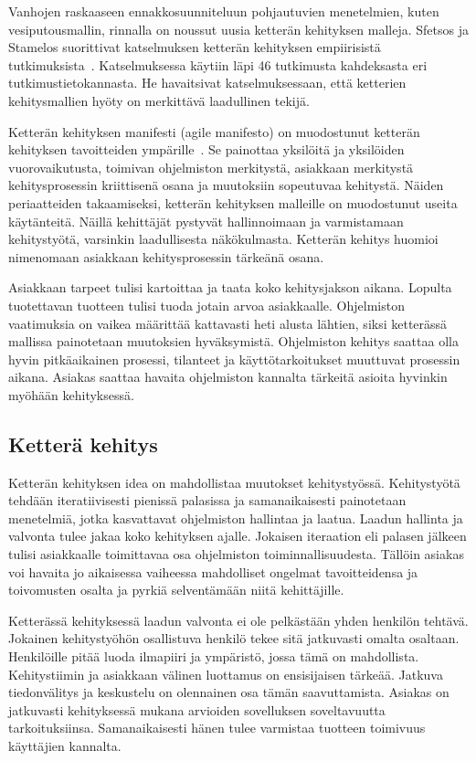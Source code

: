 \documentclass[finnish]{../tktltiki2}
\theoremstyle{definition}
\theoremstyle{remark}
\begin{document}
    Vanhojen raskaaseen ennakkosuunniteluun pohjautuvien menetelmien, kuten vesiputousmallin, rinnalla on noussut uusia 
ketterän kehityksen malleja. Sfetsos ja Stamelos suorittivat katselmuksen ketterän kehityksen empiirisistä 
tutkimuksista~\cite{SS10}. Katselmuksessa käytiin läpi 46 tutkimusta kahdeksasta eri tutkimustietokannasta. He 
havaitsivat katselmuksessaan, että ketterien kehitysmallien hyöty on merkittävä laadullinen tekijä.

    Ketterän kehityksen manifesti (agile manifesto) on muodostunut ketterän kehityksen tavoitteiden 
ympärille~\cite{BBB01}. Se painottaa yksilöitä ja yksilöiden vuorovaikutusta, toimivan ohjelmiston merkitystä, asiakkaan 
merkitystä kehitysprosessin kriittisenä osana ja muutoksiin sopeutuvaa kehitystä. Näiden periaatteiden takaamiseksi, 
ketterän kehityksen malleille on muodostunut useita käytänteitä. Näillä kehittäjät pystyvät hallinnoimaan ja 
varmistamaan kehitystyötä, varsinkin laadullisesta näkökulmasta. Ketterän kehitys huomioi nimenomaan asiakkaan 
kehitysprosessin tärkeänä osana.

    Asiakkaan tarpeet tulisi kartoittaa ja taata koko kehitysjakson aikana. Lopulta tuotettavan tuotteen tulisi tuoda 
jotain arvoa asiakkaalle. Ohjelmiston vaatimuksia on vaikea määrittää kattavasti heti alusta lähtien, siksi ketterässä 
mallissa painotetaan muutoksien hyväksymistä. Ohjelmiston kehitys saattaa olla hyvin pitkäaikainen prosessi, tilanteet 
ja käyttötarkoitukset muuttuvat prosessin aikana. Asiakas saattaa havaita ohjelmiston kannalta tärkeitä asioita hyvinkin 
myöhään kehityksessä.

\subsection{Ketterä kehitys}

Ketterän kehityksen idea on mahdollistaa muutokset kehitystyössä. Kehitystyötä tehdään iteratiivisesti pienissä 
palasissa ja samanaikaisesti painotetaan menetelmiä, jotka kasvattavat ohjelmiston hallintaa ja laatua. Laadun hallinta 
ja valvonta tulee jakaa koko kehityksen ajalle. Jokaisen iteraation eli palasen jälkeen tulisi asiakkaalle toimittavaa 
osa ohjelmiston toiminnallisuudesta. Tällöin asiakas voi havaita jo aikaisessa vaiheessa mahdolliset ongelmat 
tavoitteidensa ja toivomusten osalta ja pyrkiä selventämään niitä kehittäjille.

    Ketterässä kehityksessä laadun valvonta ei ole pelkästään yhden henkilön tehtävä. Jokainen kehitystyöhön osallistuva 
henkilö tekee sitä jatkuvasti omalta osaltaan. Henkilöille pitää luoda ilmapiiri ja ympäristö, jossa tämä on 
mahdollista. Kehitystiimin ja asiakkaan välinen luottamus on ensisijaisen tärkeää. Jatkuva tiedonvälitys ja keskustelu 
on olennainen osa tämän saavuttamista. Asiakas on jatkuvasti kehityksessä mukana arvioiden sovelluksen soveltavuutta 
tarkoituksiinsa. Samanaikaisesti hänen tulee varmistaa tuotteen toimivuus käyttäjien kannalta.
\end{document}
